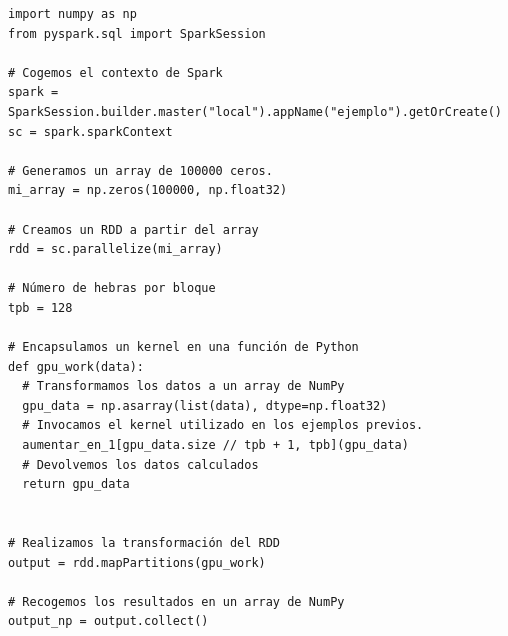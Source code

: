 \begin{code}
\begin{verbatim}
import numpy as np
from pyspark.sql import SparkSession

# Cogemos el contexto de Spark
spark = SparkSession.builder.master("local").appName("ejemplo").getOrCreate()
sc = spark.sparkContext

# Generamos un array de 100000 ceros.
mi_array = np.zeros(100000, np.float32)

# Creamos un RDD a partir del array
rdd = sc.parallelize(mi_array)

# Número de hebras por bloque
tpb = 128

# Encapsulamos un kernel en una función de Python
def gpu_work(data):
  # Transformamos los datos a un array de NumPy
  gpu_data = np.asarray(list(data), dtype=np.float32)
  # Invocamos el kernel utilizado en los ejemplos previos.
  aumentar_en_1[gpu_data.size // tpb + 1, tpb](gpu_data)
  # Devolvemos los datos calculados
  return gpu_data


# Realizamos la transformación del RDD
output = rdd.mapPartitions(gpu_work)

# Recogemos los resultados en un array de NumPy
output_np = output.collect()
\end{verbatim}
\label{code:spark}
\end{code}
